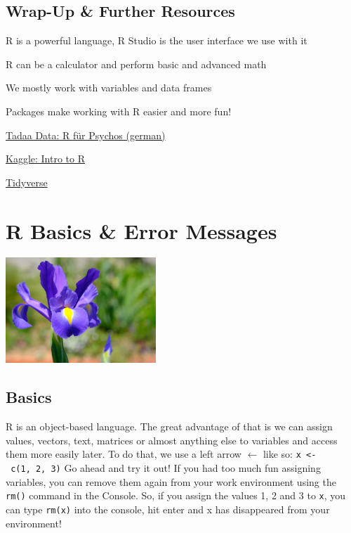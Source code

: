 \documentclass[
]{book}
\begin{document}
\section*{Wrap-Up \& Further Resources}\label{wrap-up-further-resources}

R is a powerful language, R Studio is the user interface we use with it

R can be a calculator and perform basic and advanced math

We mostly work with variables and data frames

Packages make working with R easier and more fun!

\href{https://r-intro.tadaa-data.de/index.html}{Tadaa Data: R für Psychos (german)}

\href{https://www.kaggle.com/code/hamelg/intro-to-r-part-4-variables}{Kaggle: Intro to R}

\href{https://www.tidyverse.org/}{Tidyverse}

\chapter{R Basics \& Error Messages}\label{basics}

\includegraphics[width=\textwidth,height=1.5625in]{img/iris.png}

\section{Basics}\label{basics-1}

R is an object-based language.
The great advantage of that is we can assign values, vectors, text, matrices or almost anything else to variables and access them more easily later.
To do that, we use a left arrow \(\leftarrow\) like so:
\texttt{x\ \textless{}-\ c(1,\ 2,\ 3)}
Go ahead and try it out!
If you had too much fun assigning variables, you can remove them again from your work environment using the \texttt{rm()} command in the Console.
So, if you assign the values 1, 2 and 3 to \texttt{x}, you can type \texttt{rm(x)} into the console, hit enter and x has disappeared from your environment!
\end{document}
